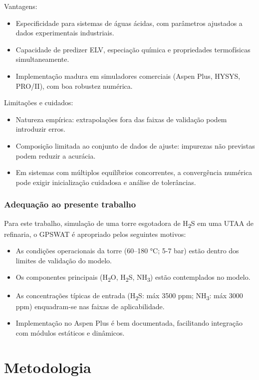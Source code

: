 \documentclass[10pt,a4paper]{article}
\begin{document}
Vantagens:
\begin{itemize}[leftmargin=4em, itemsep=0pt]
  \item Especificidade para sistemas de águas ácidas, com parâmetros ajustados a dados experimentais industriais.
  \item Capacidade de predizer ELV, especiação química e propriedades termofísicas simultaneamente.
  \item Implementação madura em simuladores comerciais (Aspen Plus, HYSYS, PRO/II), com boa robustez numérica.
\end{itemize}

Limitações e cuidados:
\begin{itemize}[leftmargin=4em, itemsep=0pt]
  \item Natureza empírica: extrapolações fora das faixas de validação podem introduzir erros.
  \item Composição limitada ao conjunto de dados de ajuste: impurezas não previstas podem reduzir a acurácia.
  \item Em sistemas com múltiplos equilíbrios concorrentes, a convergência numérica pode exigir inicialização cuidadosa e análise de tolerâncias.
\end{itemize}

\subsubsection{Adequação ao presente trabalho}

Para este trabalho, simulação de uma torre esgotadora de H\textsubscript{2}S em uma UTAA de refinaria, o GPSWAT é apropriado pelos seguintes motivos:
\begin{itemize}[leftmargin=4em, itemsep=0pt]
  \item As condições operacionais da torre (60–180 °C; 5-7 bar) estão dentro dos limites de validação do modelo.
  \item Os componentes principais (H\textsubscript{2}O, H\textsubscript{2}S, NH\textsubscript{3}) estão contemplados no modelo.
  \item As concentrações típicas de entrada (H\textsubscript{2}S: máx 3500 ppm; NH\textsubscript{3}: máx 3000 ppm) enquadram-se nas faixas de aplicabilidade.
  \item Implementação no Aspen Plus é bem documentada, facilitando integração com módulos estáticos e dinâmicos.
\end{itemize}

\section{Metodologia}\label{sec:metodologia}
\end{document}
